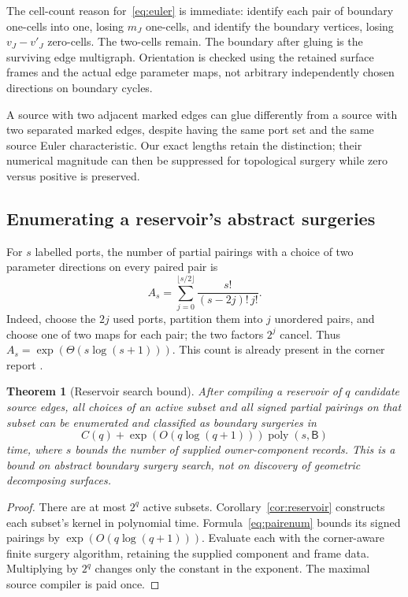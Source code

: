 \documentclass[11pt]{article}
\newtheorem{theorem}{Theorem}[section]
\theoremstyle{definition}\newtheorem{definition}[theorem]{Definition}\newtheorem{example}[theorem]{Example}
\theoremstyle{remark}\newtheorem{remark}[theorem]{Remark}
\newcommand{\poly}{\operatorname{poly}}
\newcommand{\bits}{\mathsf B}
\begin{document}
The cell-count reason for~\eqref{eq:euler} is immediate: identify each pair of boundary one-cells into one, losing $m_J$ one-cells, and identify the boundary vertices, losing $v_J-v'_J$ zero-cells. The two-cells remain. The boundary after gluing is the surviving edge multigraph. Orientation is checked using the retained surface frames and the actual edge parameter maps, not arbitrary independently chosen directions on boundary cycles.

A source with two adjacent marked edges can glue differently from a source with two separated marked edges, despite having the same port set and the same source Euler characteristic. Our exact lengths retain the distinction; their numerical magnitude can then be suppressed for topological surgery while zero versus positive is preserved.

\subsection{Enumerating a reservoir's abstract surgeries}
For $s$ labelled ports, the number of partial pairings with a choice of two parameter directions on every paired pair is
\begin{equation}\label{eq:pairenum}
                    A_s=\sum_{j=0}^{\lfloor s/2\rfloor}
                              \frac{s!}{(s-2j)!\,j!}.
\end{equation}
Indeed, choose the $2j$ used ports, partition them into $j$ unordered pairs, and choose one of two maps for each pair; the two factors $2^j$ cancel. Thus $A_s=\exp(\Theta(s\log(s+1)))$. This count is already present in the corner report \cite{corner}.

\begin{theorem}[Reservoir search bound]
\label{thm:reservoirsearch}
After compiling a reservoir of $q$ candidate source edges, all choices of an active subset and all signed partial pairings on that subset can be enumerated and classified as boundary surgeries in
\begin{equation}\label{eq:searchcost}
                  C(q)+\exp(O(q\log(q+1)))\poly(s,\bits)
\end{equation}
time, where $s$ bounds the number of supplied owner-component records. This is a bound on abstract boundary surgery search, not on discovery of geometric decomposing surfaces.
\end{theorem}
\begin{proof}
There are at most $2^q$ active subsets. Corollary~\ref{cor:reservoir} constructs each subset's kernel in polynomial time. Formula~\eqref{eq:pairenum} bounds its signed pairings by $\exp(O(q\log(q+1)))$. Evaluate each with the corner-aware finite surgery algorithm, retaining the supplied component and frame data. Multiplying by $2^q$ changes only the constant in the exponent. The maximal source compiler is paid once.
\end{proof}
\end{document}
